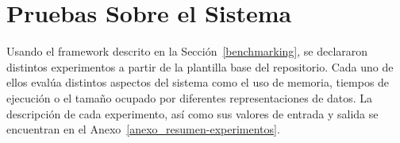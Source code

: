 \section{Pruebas Sobre el Sistema}
\label{sec:pruebas-sistema}

Usando el framework descrito en la Sección~\ref{benchmarking}, se declararon distintos experimentos a partir de la plantilla base del repositorio. Cada uno de ellos evalúa distintos aspectos del sistema como el uso de memoria, tiempos de ejecución o el tamaño ocupado por diferentes representaciones de datos. La descripción de cada experimento, así como sus valores de entrada y salida se encuentran en el Anexo~\ref{anexo_resumen-experimentos}.












